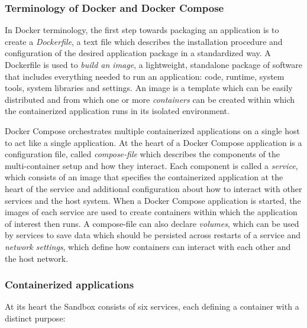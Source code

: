 \documentclass[11pt, a4paper, oneside, parskip=full-]{scrartcl}
\begin{document}
\subsubsection*{Terminology of Docker and Docker Compose}
In Docker terminology, the first step towards packaging an application is to
create a \emph{Dockerfile}, a text file which describes the installation
procedure and configuration of the desired application package in a standardized
way. A Dockerfile is used to \emph{build an image}, a lightweight, standalone
package of software that includes everything needed to run an application: code,
runtime, system tools, system libraries and settings\cite{dockerimage}. An image
is a template which can be easily distributed and from which one or more
\emph{containers} can be created within which the containerized application runs
in its isolated environment.

Docker Compose orchestrates multiple containerized applications on a single host
to act like a single application. At the heart of a Docker Compose application
is a configuration file, called \emph{compose-file} which describes the
components of the multi-container setup and how they interact. Each component is
called a \emph{service}, which consists of an image that specifies the
containerized application at the heart of the service and additional
configuration about how to interact with other services and the host system.
When a Docker Compose application is started, the images of each service are
used to create containers within which the application of interest then runs. A
compose-file can also declare \emph{volumes}, which can be used by services to
save data which should be persisted across restarts of a service and
\emph{network settings}, which define how containers can interact with each
other and the host network.

\subsubsection*{Containerized applications}
At its heart the Sandbox consists of six services, each defining a container
with a distinct purpose:
\end{document}
